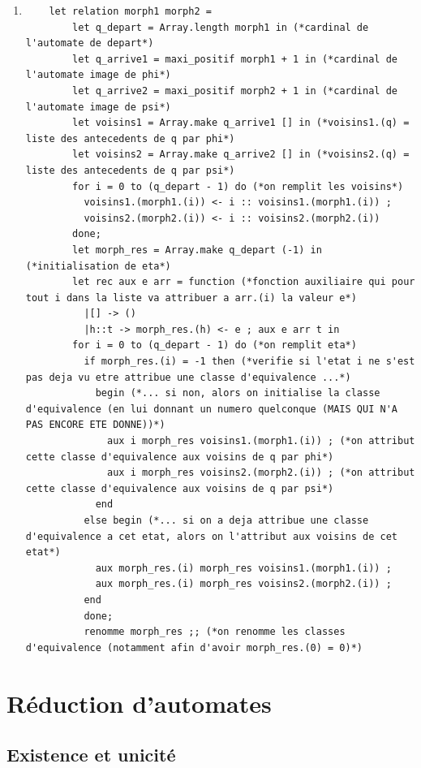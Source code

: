 \documentclass{article}
\begin{document}
\begin{enumerate}
    \item 
    \begin{verbatim}
    let relation morph1 morph2 =
        let q_depart = Array.length morph1 in (*cardinal de l'automate de depart*)
        let q_arrive1 = maxi_positif morph1 + 1 in (*cardinal de l'automate image de phi*)
        let q_arrive2 = maxi_positif morph2 + 1 in (*cardinal de l'automate image de psi*)
        let voisins1 = Array.make q_arrive1 [] in (*voisins1.(q) = liste des antecedents de q par phi*)
        let voisins2 = Array.make q_arrive2 [] in (*voisins2.(q) = liste des antecedents de q par psi*)
        for i = 0 to (q_depart - 1) do (*on remplit les voisins*)
          voisins1.(morph1.(i)) <- i :: voisins1.(morph1.(i)) ;
          voisins2.(morph2.(i)) <- i :: voisins2.(morph2.(i))
        done;
        let morph_res = Array.make q_depart (-1) in (*initialisation de eta*)
        let rec aux e arr = function (*fonction auxiliaire qui pour tout i dans la liste va attribuer a arr.(i) la valeur e*)
          |[] -> ()
          |h::t -> morph_res.(h) <- e ; aux e arr t in
        for i = 0 to (q_depart - 1) do (*on remplit eta*)
          if morph_res.(i) = -1 then (*verifie si l'etat i ne s'est pas deja vu etre attribue une classe d'equivalence ...*)
            begin (*... si non, alors on initialise la classe d'equivalence (en lui donnant un numero quelconque (MAIS QUI N'A PAS ENCORE ETE DONNE))*)
              aux i morph_res voisins1.(morph1.(i)) ; (*on attribut cette classe d'equivalence aux voisins de q par phi*)
              aux i morph_res voisins2.(morph2.(i)) ; (*on attribut cette classe d'equivalence aux voisins de q par psi*)
            end
          else begin (*... si on a deja attribue une classe d'equivalence a cet etat, alors on l'attribut aux voisins de cet etat*)
            aux morph_res.(i) morph_res voisins1.(morph1.(i)) ;
            aux morph_res.(i) morph_res voisins2.(morph2.(i)) ;
          end
          done;
          renomme morph_res ;; (*on renomme les classes d'equivalence (notamment afin d'avoir morph_res.(0) = 0)*)
    \end{verbatim}
\end{enumerate}

\section{R\'eduction d'automates}

\subsection{Existence et unicit\'e}
\end{document}
